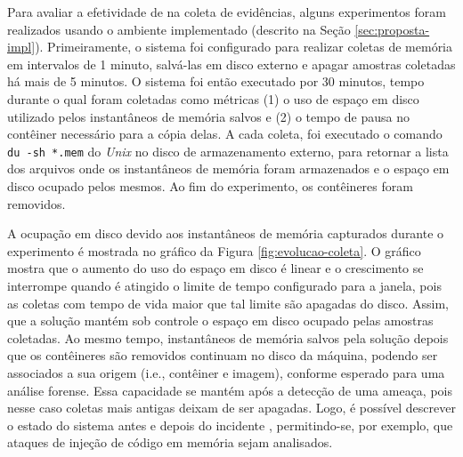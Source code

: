 Para avaliar a efetividade de \fancyname na coleta de evidências, alguns experimentos foram realizados usando o ambiente implementado (descrito na Seção \ref{sec:proposta-impl}).
%
Primeiramente, o sistema foi configurado para realizar coletas de memória em intervalos de 1 minuto, salvá-las em disco externo e apagar amostras coletadas há mais de 5 minutos. 
%
O sistema foi então executado por 30 minutos, tempo durante o qual foram coletadas como métricas (1) o uso de espaço em disco utilizado pelos instantâneos de memória salvos e (2) o tempo de pausa no contêiner necessário para a cópia delas.
%
A cada coleta, foi executado o comando \texttt{du -sh *.mem} do \textit{Unix} no disco de armazenamento externo, para retornar a lista dos arquivos onde os instantâneos de memória foram armazenados e o espaço em disco ocupado pelos mesmos. 
%
Ao fim do experimento, os contêineres foram removidos.


A ocupação em disco devido aos instantâneos de memória capturados durante o experimento é mostrada no gráfico da Figura \ref{fig:evolucao-coleta}. 
%
O gráfico mostra que o aumento do uso do espaço em disco é linear e o crescimento se interrompe quando é atingido o limite de tempo configurado para a janela, pois as coletas com tempo de vida maior que tal limite são apagadas do disco. 
%
Assim, que a solução mantém sob controle o espaço em disco ocupado pelas amostras coletadas.
%
Ao mesmo tempo, instantâneos de memória salvos pela solução depois que os contêineres são removidos continuam no disco da máquina, podendo ser associados a sua origem (i.e., contêiner e imagem), conforme esperado para uma análise forense.
%
Essa capacidade se mantém após a detecção de uma ameaça, pois nesse caso coletas mais antigas deixam de ser apagadas.
%
Logo, é possível descrever o estado do sistema antes e depois do incidente \cite{CaseMemoryForensics:2014}, permitindo-se, por exemplo, que ataques de injeção de código em memória sejam analisados.


